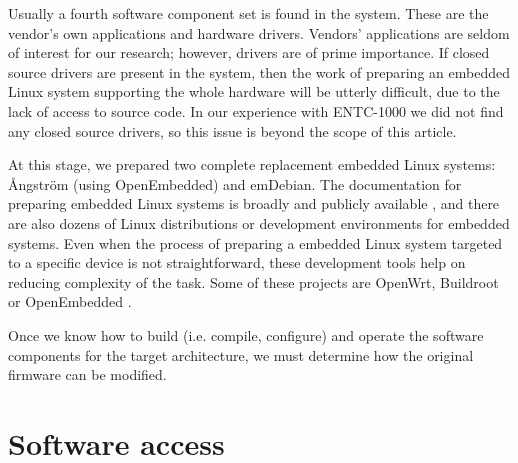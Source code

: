 \documentclass[conference]{IEEEtran}
\newcommand{\nota}[1]{}
\begin{document}
Usually a fourth software component set is found in the system. These are the vendor's own applications and hardware drivers. Vendors' applications are seldom of interest for our research; however, drivers are of prime importance. If closed source drivers are present in the system, then the work of preparing an embedded Linux system supporting the whole hardware will be utterly difficult, due to the lack of access to source code. In our experience with ENTC-1000 we did not find any closed source drivers, so this issue is beyond the scope of this article.
 
\nota{
El trabajo realizado en este punto fue la preparación
de dos sistemas Linux embebidos completos de reemplazo: Amstrong y emDebian.
La documentación para preparar sistemas Linux embebidos es amplia y públicamente
disponible (referencias). Además, existen decenas de
distribuciones Linux para embebidos,
o entornos de desarrollo de distribuciones Linux para embebidos
\footnote{No confundir distribución con entorno de desarrollo}. Estas herramientas
facilitan la preparación de un sistema para un dispositivo específico.
Algunas de estos proyectos son Openwrt, Buildroot, u OpenEmbedded (referencias).

Una vez que se tiene el conocimiento en cómo construir (compilar y configurar)
y operar los componentes de software para la arquitectura destino, se
debe realizar un análisis de si es posible o no modificar el firmware original.
}

At this stage, we prepared two complete replacement embedded Linux systems: Ångström (using OpenEmbedded) and emDebian. The documentation for preparing embedded Linux systems is broadly and publicly available \cite{emb1, emb2, freeelectron}, and there are also dozens of Linux distributions or development environments for embedded systems. 
Even when the process of preparing a embedded Linux system targeted to a specific device is not 
straightforward, these development tools help on reducing complexity of the task.
Some of these projects are OpenWrt, Buildroot or OpenEmbedded \cite{openwrt, openembedded, buildroot}.

Once we know how to build (i.e. compile, configure) and operate the software components for the target architecture, we must determine how the original firmware can be modified.

\section{Software access}
\end{document}
